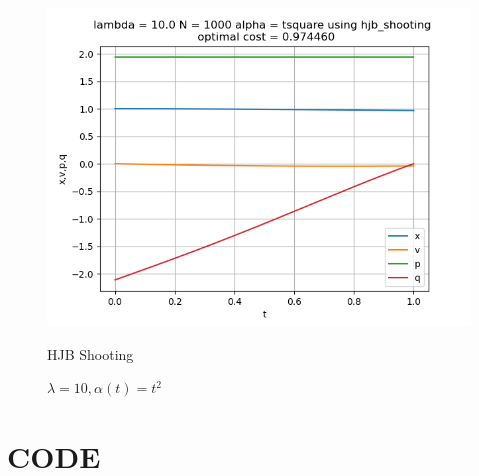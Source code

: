 \begin{figure}[H]
\begin{minipage}{0.3\textwidth}
		\includegraphics[width=\linewidth]{hjb_shooting_l10_alphat2.png}
		\caption{HJB Shooting}
	\end{minipage}
	\caption{$\lambda = 10, \alpha(t) =t^2$}
\end{figure}

\pagebreak

\section{CODE}




